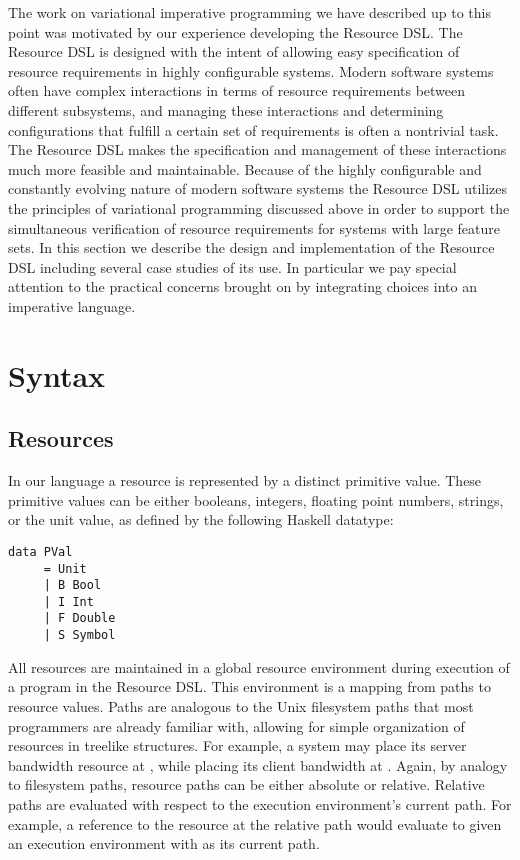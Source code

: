 \documentclass[12pt,oneside]{book}
\begin{document}
The work on variational imperative programming we have described up to this point was motivated
by our experience developing the Resource DSL. The Resource DSL is designed with the intent of
allowing easy specification of resource requirements in highly configurable systems. Modern software
systems often have complex interactions in terms of resource requirements between different subsystems,
and managing these interactions and determining configurations that fulfill a certain set of requirements
is often a nontrivial task. The Resource DSL makes the specification and management
of these interactions much more feasible and maintainable. Because of the highly configurable and constantly evolving
nature of modern software systems the Resource DSL utilizes the principles of variational programming
discussed above in order to support the simultaneous verification of resource requirements for
systems with large feature sets. In this section we describe the design and implementation of the
Resource DSL including several case studies of its use. In particular we pay special attention to the
practical concerns brought on by integrating choices into an imperative language.

\section{Syntax}

\subsection{Resources}

In our language a resource is represented by a distinct primitive value. These primitive values
can be either booleans, integers, floating point numbers, strings, or the unit value, as defined
by the following Haskell datatype:

\begin{lstlisting}
data PVal
     = Unit
     | B Bool
     | I Int
     | F Double
     | S Symbol
\end{lstlisting}

All resources are maintained in a global resource environment during execution of a program
in the Resource DSL. This environment is a mapping from paths to resource values. Paths are
analogous to the Unix filesystem paths that most programmers are already familiar with, allowing for
simple organization of resources in treelike structures. For example, a system may place its server
bandwidth resource at , while placing its client bandwidth at .
Again, by analogy to filesystem paths, resource paths can be either absolute or relative. Relative paths are
evaluated with respect to the execution environment's current path. For example, a reference to the resource
at the relative path  would evaluate to 
given an execution environment with  as its current path.
\end{document}

